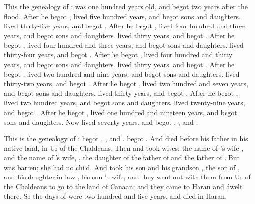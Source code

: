 
\bverse This \is the genealogy of :  was one hundred years old, and begot  two years after the flood.
\bverse After he begot ,  lived five hundred years, and begot sons and daughters.
\bverse {} lived thirty-five years, and begot .
\bverse After he begot ,  lived four hundred and three years, and begot sons and daughters.
\bverse {} lived thirty years, and begot .
\bverse After he begot ,  lived four hundred and three years, and begot sons and daughters.
\bverse {} lived thirty-four years, and begot .
\bverse After he begot ,  lived four hundred and thirty years, and begot sons and daughters.
\bverse {} lived thirty years, and begot . 
\bverse After he begot ,  lived two hundred and nine years, and begot sons and daughters.
\bverse {} lived thirty-two years, and begot .
\bverse After he begot ,  lived two hundred and seven years, and begot sons and daughters.
\bverse {} lived thirty years, and begot .
\bverse After he begot ,  lived two hundred years, and begot sons and daughters.
\bverse {} lived twenty-nine years, and begot .
\bverse After he begot ,  lived one hundred and nineteen years, and begot sons and daughters.
\bverse Now  lived seventy years, and begot , , and .


\bverse This is the genealogy of :  begot , , and .  begot .
\bverse And  died before his father  in his native land, in Ur of the Chaldeans.
\bverse Then  and  took wives: the name of 's wife \was {}, and the name of 's wife, , the daughter of  the father of  and the father of .
\bverse But  was barren; she had no child.
\bverse And  took his son  and his grandson , the son of , and his daughter-in-law , his son 's wife, and they went out with them from Ur of the Chaldeans to go to the land of Canaan; and they came to Haran and dwelt there.
\bverse So the days of  were two hundred and five years, and  died in Haran.



